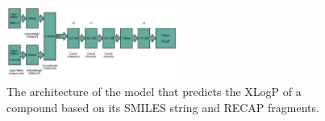 
  \begin{figure}[htbp]
        \includegraphics[width=0.5\textwidth]{figures/XLogP_frag_model_arquitecture.jpg}
        \caption{The architecture of the model that predicts the XLogP of a compound based on its SMILES string and RECAP fragments.}
        \label{fig:xlogp-archi2}
    \end{figure}